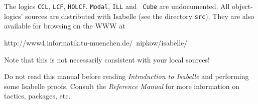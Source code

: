 The logics \texttt{CCL}, \texttt{LCF}, \texttt{HOLCF}, \texttt{Modal}, \texttt{ILL} and {\tt
  Cube} are undocumented.  All object-logics' sources are
distributed with Isabelle (see the directory \texttt{src}).  They are
also available for browsing on the WWW at
\begin{ttbox}
http://www4.informatik.tu-muenchen.de/~nipkow/isabelle/
\end{ttbox}
Note that this is not necessarily consistent with your local sources!

\medskip Do not read this manual before reading \emph{Introduction to
  Isabelle} and performing some Isabelle proofs.  Consult the {\em Reference
  Manual} for more information on tactics, packages, etc.


